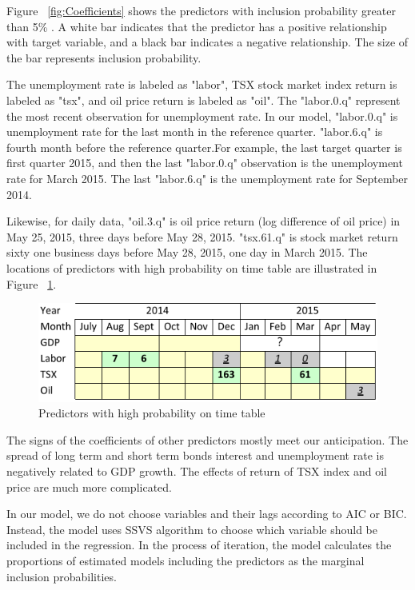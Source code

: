 Figure ~\ref{fig:Coefficients} shows the predictors with inclusion probability greater than 5\% . A white bar indicates that the predictor has a positive relationship with target variable, and a black bar indicates a negative relationship. The size of the bar represents inclusion probability. 

The unemployment rate is labeled as "labor", TSX stock market index return is labeled as "tsx", and oil price return is labeled as "oil". The "labor.0.q" represent the most recent observation for unemployment rate. In our model, "labor.0.q" is unemployment rate for the last month in the reference quarter. "labor.6.q" is fourth month before the reference quarter.For example, the last target quarter is first quarter 2015, and then the last "labor.0.q" observation is the  unemployment rate for March 2015. The last "labor.6.q" is the unemployment rate for September 2014. 

Likewise, for daily data, "oil.3.q" is oil price return (log difference of oil price) in May 25, 2015, three days before May 28, 2015. "tsx.61.q" is stock market return sixty one business days before May 28, 2015, one day in March 2015.  The locations of predictors with high probability on time table  are illustrated in Figure ~\ref{fig:MonthQuarterYear}. 


\begin{figure}
	\centering
	\includegraphics[width=0.7\linewidth]{Figures/MonthQuarterYear}
	\caption{Predictors with high probability on time table}
	\label{fig:MonthQuarterYear}
\end{figure}



The signs of the coefficients of other predictors mostly meet our anticipation. The spread of long term and short term bonds interest and unemployment rate is negatively related to GDP growth. The effects of return of TSX index and oil price are much more complicated. 

In our model, we do not choose variables and their lags according to AIC or BIC. Instead, the model uses SSVS algorithm to choose which variable should be included in the regression. In the process of iteration, the model calculates the proportions of estimated models including the predictors as the marginal inclusion probabilities.












